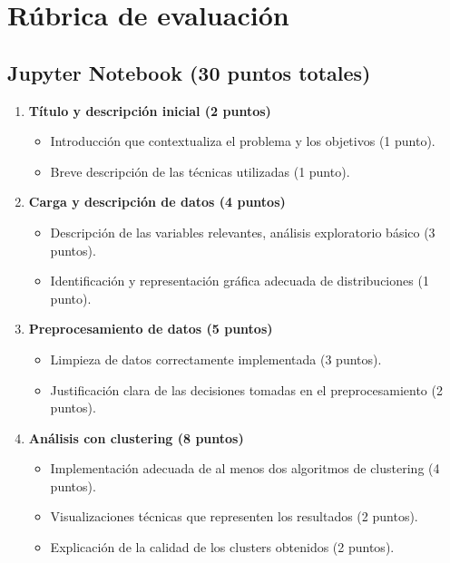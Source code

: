 \documentclass[a4,11pt]{aleph-notas}
\begin{document}
\section{Rúbrica de evaluación}
\subsection*{Jupyter Notebook (30 puntos totales)}
\begin{enumerate}[leftmargin=*,label=\textbf{\arabic*.}]
    \item \textbf{Título y descripción inicial (2 puntos)}
    \begin{itemize}[leftmargin=*]
        \item Introducción que contextualiza el problema y los objetivos (1 punto).
        \item Breve descripción de las técnicas utilizadas (1 punto).
    \end{itemize}

    \item \textbf{Carga y descripción de datos (4 puntos)}
    \begin{itemize}[leftmargin=*]
        \item Descripción de las variables relevantes, análisis exploratorio básico (3 puntos).
        \item Identificación y representación gráfica adecuada de distribuciones (1 punto).
    \end{itemize}

    \item \textbf{Preprocesamiento de datos (5 puntos)}
    \begin{itemize}[leftmargin=*]
        \item Limpieza de datos correctamente implementada (3 puntos).
        \item Justificación clara de las decisiones tomadas en el preprocesamiento (2 puntos).
    \end{itemize}

    \item \textbf{Análisis con clustering (8 puntos)}
    \begin{itemize}[leftmargin=*]
        \item Implementación adecuada de al menos dos algoritmos de clustering (4 puntos).
        \item Visualizaciones técnicas que representen los resultados (2 puntos).
        \item Explicación de la calidad de los clusters obtenidos (2 puntos).
    \end{itemize}


\end{enumerate}
\end{document}
